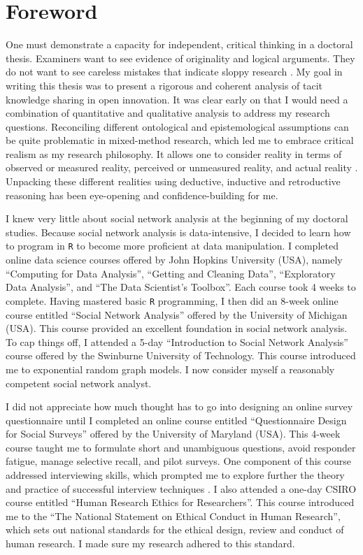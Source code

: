 \documentclass[12pt,table,xcdraw]{book}
\begin{document}
\chapter*{Foreword}

One must demonstrate a capacity for independent, critical thinking in a doctoral thesis. Examiners want to see evidence of originality and logical arguments. They do not want to see careless mistakes that indicate sloppy research \citep{mullins2002its}. My goal in writing this thesis was to present a rigorous and coherent analysis of tacit knowledge sharing in open innovation. It was clear early on that I would need a combination of quantitative and qualitative analysis to address my research questions. Reconciling different ontological and epistemological assumptions can be quite problematic in mixed-method research, which led me to embrace critical realism as my research philosophy. It allows one to consider reality in terms of observed or measured reality, perceived or unmeasured reality, and actual reality \citep{bhaskar2013realist}. Unpacking these different realities using deductive, inductive and retroductive reasoning has been eye-opening and confidence-building for me. \medskip

I knew very little about social network analysis at the beginning of my doctoral studies. Because social network analysis is data-intensive, I decided to learn how to program in \texttt{R} to become more proficient at data manipulation. I completed online data science courses offered by John Hopkins University (USA), namely \enquote{Computing for Data Analysis}, \enquote{Getting and Cleaning Data}, \enquote{Exploratory Data Analysis}, and \enquote{The Data Scientist's Toolbox}. Each course took 4 weeks to complete. Having mastered basic \texttt{R} programming, I then did an 8-week online course entitled \enquote{Social Network Analysis} offered by the University of Michigan (USA). This course provided an excellent foundation in social network analysis. To cap things off, I attended a 5-day \enquote{Introduction to Social Network Analysis} course offered by the Swinburne University of Technology. This course introduced me to exponential random graph models. I now consider myself a reasonably competent social network analyst. \medskip

I did not appreciate how much thought has to go into designing an online survey questionnaire until I completed an online course entitled \enquote{Questionnaire Design for Social Surveys} offered by the University of Maryland (USA). This 4-week course taught me to formulate short and unambiguous questions, avoid responder fatigue, manage selective recall, and pilot surveys. One component of this course addressed interviewing skills, which prompted me to explore further the theory and practice of successful interview techniques \citep[e.g.][]{kvale2008doing,seidman2012interviewing}. I also attended a one-day CSIRO course entitled \enquote{Human Research Ethics for Researchers}. This course introduced me to the \enquote{The National Statement on Ethical Conduct in Human Research}, which sets out national standards for the ethical design, review and conduct of human research. I made sure my research adhered to this standard. \medskip
\end{document}
